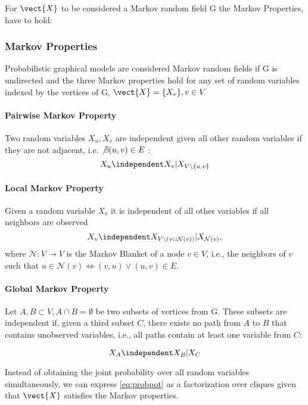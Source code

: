 For $\vect{X}$ to be considered a Markov random field \wrt G the Markov Properties, have to hold:

\subsubsection*{Markov Properties}
Probabilistic graphical models are considered Markov random fields if G is undirected and the three Markov properties hold for any set of random variables indexed by the vertices of G, $\vect{X} = \{X_v\}, v \in V$

\paragraph*{Pairwise Markov Property}
Two random variables $X_u, X_v$ are independent given all other random variables if they are not adjacent, i.e. $\not\exists (u,v) \in E$ :
\begin{equation}
    X_u \independent X_v \lvert X_{V \setminus\{u,v\}}
\end{equation}

\paragraph*{Local Markov Property}
Given a random variable $X_v$ it is independent of all other variables if all neighbors are observed 
\begin{equation}
    X_v \independent X_{V\setminus (v \cup \mathcal{N}(v))} \lvert X_{\mathcal{N}(v)},   
\end{equation}
where $\mathcal{N}: V \rightarrow V$ is the Markov Blanket of a node $v \in V$, i.e., the neighbors of $v$ such that $u \in \mathcal{N}(v) \Leftrightarrow (v,u) \vee (u,v) \in E$.

\paragraph*{Global Markov Property}
Let $A, B \subset V, A \cap B = \emptyset$ be two subsets of vertices from G. 
These subsets are independent if, given a third subset $C$, there exists no path from $A$ to $B$ that contains unobserved variables, i.e., all paths contain at least one variable from $C$:

\begin{equation}
    X_A \independent X_B \lvert X_C
\end{equation}

Instead of obtaining the joint probability over all random variables simultaneously, we can express \autoref{eq:probpot} as a factorization over cliques given that $\vect{X}$ satisfies the Markov properties. 

